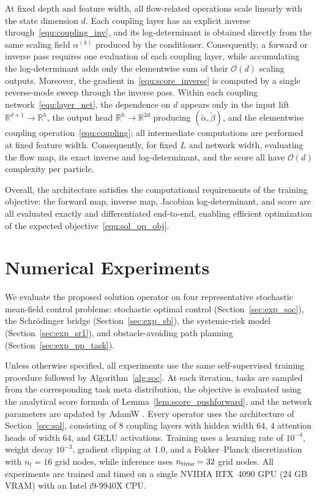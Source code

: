 \documentclass[preprint]{elsarticle}
\newcommand{\R}{\mathbb{R}}
\begin{document}
At fixed depth and feature width, all flow-related operations scale linearly with the state dimension $d$. Each coupling layer has an explicit inverse through~\eqref{equ:coupling_inv}, and its log-determinant is obtained directly from the same scaling field $\alpha^{(k)}$ produced by the conditioner. Consequently, a forward or inverse pass requires one evaluation of each coupling layer, while accumulating the log-determinant adds only the elementwise sum of their $\mathcal O(d)$ scaling outputs. Moreover, the gradient in~\eqref{equ:score_inverse} is computed by a single reverse-mode sweep through the inverse pass. Within each coupling network~\eqref{equ:layer_net}, the dependence on $d$ appears only in the input lift $\R^{d+1}\to\R^h$, the output head $\R^h\to\R^{2d}$ producing $(\tilde\alpha,\tilde\beta)$, and the elementwise coupling operation~\eqref{equ:coupling}; all intermediate computations are performed at fixed feature width. Consequently, for fixed $L$ and network width, evaluating the flow map, its exact inverse and log-determinant, and the score all have $\mathcal O(d)$ complexity per particle.

Overall, the architecture satisfies the computational requirements of the training objective: the forward map, inverse map, Jacobian log-determinant, and score are all evaluated exactly and differentiated end-to-end, enabling efficient optimization of the expected objective~\eqref{equ:sol_op_obj}.


\section{Numerical Experiments}\label{sec:results}

We evaluate the proposed solution operator on four representative stochastic mean-field control problems: stochastic optimal control (Section~\ref{sec:exp_soc}), the Schr\"odinger bridge (Section~\ref{sec:exp_sb}), the systemic-risk model (Section~\ref{sec:exp_sr1}), and obstacle-avoiding path planning (Section~\ref{sec:exp_pp_task}).

Unless otherwise specified, all experiments use the same self-supervised training procedure followed by Algorithm~\ref{alg:soc}. At each iteration, tasks are sampled from the corresponding task meta distribution, the objective is evaluated using the analytical score formula of Lemma~\ref{lem:score_pushforward}, and the network parameters are updated by AdamW \cite{loshchilov2018decoupled}. Every operator uses the architecture of Section~\ref{sec:sol}, consisting of $8$ coupling layers with hidden width $64$, $4$ attention heads of width $64$, and GELU activations. Training uses a learning rate of $10^{-4}$, weight decay $10^{-3}$, gradient clipping at $1.0$, and a Fokker--Planck discretization with $n_{t}=16$ grid nodes, while inference uses $n_{\rm time}=32$ grid nodes. All experiments are trained and timed on a single NVIDIA RTX~4090 GPU (24 GB VRAM) with an Intel i9-9940X CPU.
\end{document}
